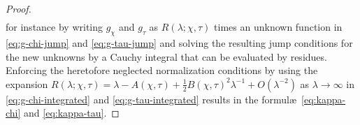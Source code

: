\begin{proof}
\begin{align}
\end{align}
for instance by writing $g_\chi$ and $g_\tau$ as $R(\lambda;\chi,\tau)$ times an unknown function in \eqref{eq:g-chi-jump} and \eqref{eq:g-tau-jump} and solving the resulting jump conditions for the new unknowns by a Cauchy integral that can be evaluated by residues. Enforcing the heretofore neglected normalization conditions 
by using the expansion $R(\lambda;\chi,\tau) = \lambda - A(\chi,\tau) + \tfrac{1}{2}B(\chi,\tau)^2 \lambda^{-1} + O(\lambda^{-2})$
as $\lambda\to\infty$ in \eqref{eq:g-chi-integrated} and \eqref{eq:g-tau-integrated} results in the formul\ae\ \eqref{eq:kappa-chi} and \eqref{eq:kappa-tau}.

\end{proof}
